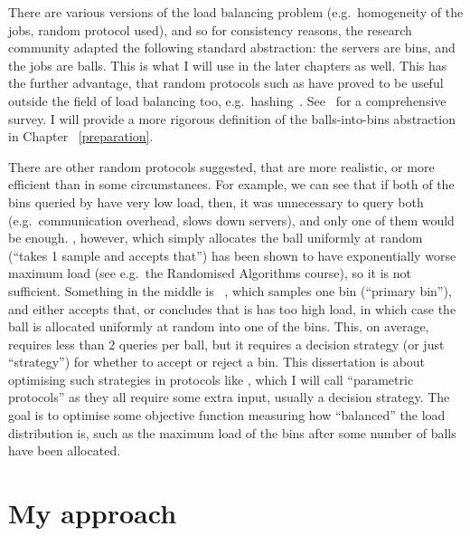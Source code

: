 There are various versions of the load balancing problem (e.g.\ homogeneity of the jobs, random protocol used), and so for consistency reasons, the research community adapted the following standard abstraction: the servers are bins, and the jobs are balls. This is what I will use in the later chapters as well. This has the further advantage, that random protocols such as \TwoChoice have proved to be useful outside the field of load balancing too, e.g.\ hashing~\cite{azar1999twochoice}. See~\cite{udi2017ballsintobinslandscape} for a comprehensive survey. I will provide a more rigorous definition of the balls-into-bins abstraction in Chapter ~\ref{preparation}.


There are other random protocols suggested, that are more realistic, or more efficient than \TwoChoice in some circumstances. For example, we can see that if both of the bins queried by \TwoChoice have very low load, then, it was unnecessary to query both (e.g.\ communication overhead, slows down servers), and only one of them would be enough. \OneChoice, however, which simply allocates the ball uniformly at random (``takes 1 sample and accepts that'') has been shown to have exponentially worse maximum load (see e.g.\ the Randomised Algorithms course), so it is not sufficient. Something in the middle is \TwoThinning~\cite{feldheim2021thinning}, which samples one bin (``primary bin''), and either accepts that, or concludes that is has too high load, in which case the ball is allocated uniformly at random into one of the bins. This, on average, requires less than $2$ queries per ball, but it requires a decision strategy (or just ``strategy'') for whether to accept or reject a bin. This dissertation is about optimising such strategies in protocols like \TwoThinning, which I will call ``parametric protocols'' as they all require some extra input, usually a decision strategy. The goal is to optimise some objective function measuring how ``balanced'' the load distribution is, such as the maximum load of the bins after some number of balls have been allocated.



\section{My approach}

